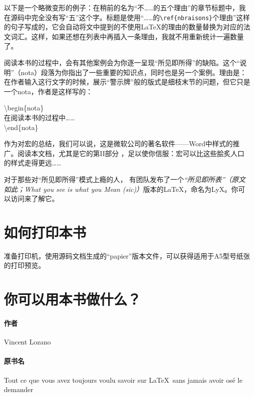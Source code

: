 以下是一个略微变形的例子：在稍前的名为“不……的五个理由”的章节标题中，我在源码中完全没有写“五”这个字。标题是使用“……的\texttt{\backslash ref\{nbraisons\}}个理由”这样的句子写成的，它会自动将文中提到的不使用\LaTeX 的理由的数量替换为对应的法文词汇。这样，如果还想在列表中再插入一条理由，我就不用重新统计一遍数量了。

\begin{exclamation}
    阅读本书的过程中，会有其他案例会为你逐一呈现“所见即所得”的缺陷。这个“说明”（nota）段落为你指出了一些重要的知识点，同时也是另一个案例。理由是：在作者输入这行文字的时候，展示“警示牌”般的版式是细枝末节的问题，但它只是一个nota，作者是这样写的：

    \begin{dmd}
        \backslash begin\{nota\}\\
        \hspace*{1em}在阅读本书的过程中……\\
        \backslash end\{nota\}
    \end{dmd}
\end{exclamation}

作为对宏的总结，我们可以说，这是微软公司的著名软件——Word中样式的推广。阅读本文档，尤其是它的第II部分%
，足以使你信服：宏可以比这些脍炙人口的样式走得更远……

对于那些对“所见即所得”模式上瘾的人， 有团队发布了一个\textit{“所见即所表”（原文如此；What you see is what you Mean (sic)）}版本的\LaTeX ，命名为LyX。你可以访问来了解它。

\section*{如何打印本书}

准备打印机，使用源码文档生成的“papier”版本文件，可以获得适用于A5型号纸张的打印预览。

\section*{你可以用本书做什么？}

\paragraph*{作者}Vincent Lozano
\paragraph*{原书名}Tout ce que vous avez toujours voulu savoir sur \LaTeX \ sans jamais avoir osé le demander
